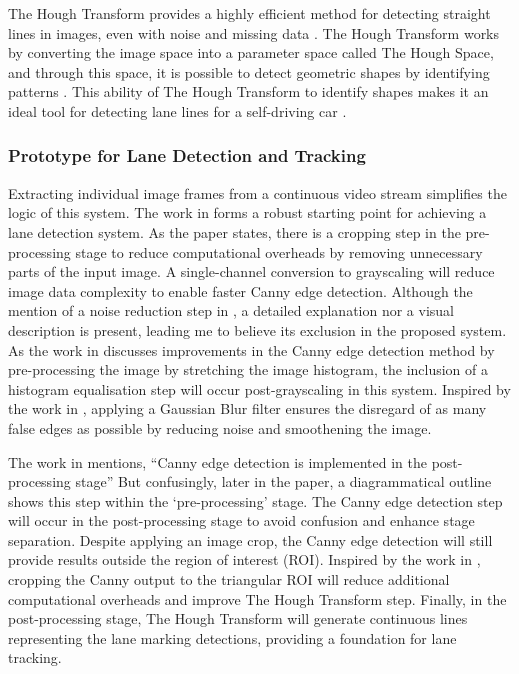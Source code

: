 \documentclass[9pt,conference]{IEEEtran}
\begin{document}
The Hough Transform provides a highly efficient method for detecting straight lines in images, even with noise and missing data \cite{b4}. The Hough Transform works by converting the image space into a parameter space called The Hough Space, and through this space, it is possible to detect geometric shapes by identifying patterns \cite{b5}. This ability of The Hough Transform to identify shapes makes it an ideal tool for detecting lane lines for a self-driving car \cite{b6}.

\subsubsection{Prototype for Lane Detection and Tracking}

Extracting individual image frames from a continuous video stream simplifies the logic of this system. The work in \cite{b3} forms a robust starting point for achieving a lane detection system. As the paper states, there is a cropping step in the pre-processing stage to reduce computational overheads by removing unnecessary parts of the input image. A single-channel conversion to grayscaling will reduce image data complexity to enable faster Canny edge detection. Although the mention of a noise reduction step in \cite{b3}, a detailed explanation nor a visual description is present, leading me to believe its exclusion in the proposed system. As the work in \cite{b7} discusses improvements in the Canny edge detection method by pre-processing the image by stretching the image histogram, the inclusion of a histogram equalisation step will occur post-grayscaling in this system. Inspired by the work in \cite{b6}, applying a Gaussian Blur filter ensures the disregard of as many false edges as possible by reducing noise and smoothening the image.

The work in \cite{b3} mentions, ``Canny edge detection is implemented in the post-processing stage'' But confusingly, later in the paper, a diagrammatical outline shows this step within the `pre-processing' stage. The Canny edge detection step will occur in the post-processing stage to avoid confusion and enhance stage separation. Despite applying an image crop, the Canny edge detection will still provide results outside the region of interest (ROI). Inspired by the work in \cite{b6}, cropping the Canny output to the triangular ROI will reduce additional computational overheads and improve The Hough Transform step. Finally, in the post-processing stage, The Hough Transform will generate continuous lines representing the lane marking detections, providing a foundation for lane tracking.
\end{document}
